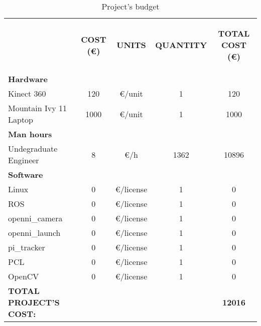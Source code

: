 \begin{table}[H]
\centering
\begin{tabular} {l c c c c}
\toprule
\addlinespace[3mm]
   \multicolumn{1}{c}{\begin{center}\textbf{ITEM}\end{center}} &
   \multicolumn{1}{c}{\begin{center}\textbf{COST (\euro)}\end{center}} &
   \multicolumn{1}{c}{\begin{center}\textbf{UNITS}\end{center}} &
   \multicolumn{1}{c}{\begin{center}\textbf{QUANTITY}\end{center}} &
   \multicolumn{1}{c}{\begin{center}\textbf{TOTAL COST (\euro)}\end{center}} &
\\
\addlinespace[-3mm]
\midrule
\textbf{Hardware}	&&&&		\\					
\hspace*{0.5cm}	Kinect 360	&	120	&	\euro/unit	&	1 	&	120 \\
\hspace*{0.5cm}	Mountain Ivy 11 Laptop	&	1000	&	\euro/unit	&	1	&	1000\\		
\textbf{Man hours}													&&&&		\\		
\hspace*{0.5cm}	Undegraduate Engineer	&	8	&	\euro/h		&	1362	&	10896 \\
						
\textbf{Software}			&&&&		\\						
						
\hspace*{0.5cm}	Linux	&	0 &	\euro/license	&	1	&	0\\
\hspace*{0.5cm}	ROS	&	0	&\euro/license&	1	&0\\
\hspace*{0.8cm}		openni\_camera	&	0	&	\euro/license	&1&		0\\
\hspace*{0.8cm}		openni\_launch	&	0	&	\euro/license	&1&	0\\
\hspace*{0.8cm}		pi\_tracker 		&	0	&	\euro/license	&1&	0\\
\hspace*{0.5cm}	PCL		&	0	&	\euro/license	&	1	&	0\\
\hspace*{0.5cm}	OpenCV	&	0	&	\euro/license	&	1	&	0\\
						
\midrule

\textbf{TOTAL PROJECT'S COST: }			&&&&			\textbf{12016}\\

\bottomrule
\end{tabular}
\caption[Project's budget]{Project's budget}
\label{budget}

\end{table}



